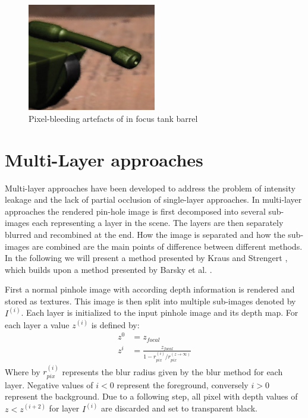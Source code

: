 \begin{figure}[h]
    \centering
    \includegraphics[width=0.5\textwidth]{images/pixel-bleeding.jpg}
    \caption{Pixel-bleeding artefacts of in focus tank barrel \cite{Demers.2005}}
    \label{fig:pxl-bleeeding}
\end{figure}

\section{Multi-Layer approaches}
Multi-layer approaches have been developed to address the problem of intensity leakage and the lack of partial occlusion of single-layer approaches.
In multi-layer approaches the rendered pin-hole image is first decomposed into several sub-images each representing a layer in the scene.
The layers are then separately blurred and recombined at the end.
How the image is separated and how the sub-images are combined are the main points of difference between different methods.
In the following we will present a method presented by Kraus and Strengert \cite{Kraus.2007}, which builds upon a method presented by Barsky et al. \cite{BrianA.Barsky.2005}.

First a normal pinhole image with according depth information is rendered and stored as textures.
This image is then split into multiple sub-images denoted by $I^{(i)}$.
Each layer is initialized to the input pinhole image and its depth map.
For each layer a value $z^{(i)}$ is defined by:
\begin{align}
    z^0 &= z_{focal} \\
    z^i &= \frac{z_{focal}}{1 - r^{(i)}_{pix} / r^{(z \rightarrow \infty)}_{pix}}
\end{align}
Where by $r^{(i)}_{pix}$ represents the blur radius given by the blur method for each layer.
Negative values of $i < 0$ represent the foreground, conversely $i > 0$ represent the background.
Due to a following step, all pixel with depth values of $z < z^{(i+2)}$ for layer $I^{(i)}$ are discarded and set to transparent black.\cite{Kraus.2007}

